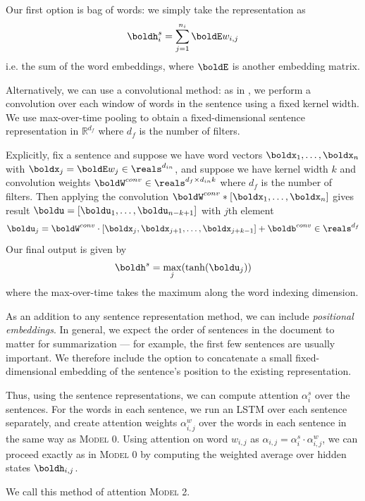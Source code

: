 \documentclass[12pt]{report}
\begin{document}
Our first option is bag of words: we simply take the representation as
\begin{equation}
\boldh_i^s = \sum_{j=1}^{n_i} \boldE w_{i,j}
\end{equation}
i.e. the sum of the word embeddings, where $\boldE$ is another embedding matrix.

Alternatively, we can use a convolutional method: as in \citet{kim2014convolutional}, we perform a convolution over each window of words in the sentence using a fixed kernel width. We use max-over-time pooling to obtain a fixed-dimensional sentence representation in $\mathbb{R}^{d_f}$ where $d_f$ is the number of filters.

Explicitly, fix a sentence and suppose we have word vectors $\boldx_1, \ldots, \boldx_n$ with $\boldx_j = \boldE w_j \in \reals^{d_{in}}$, and suppose we have kernel width $k$ and convolution weights $\boldW^{conv} \in \reals^{d_f \times d_{in} k}$ where $d_f$ is the number of filters. Then applying the convolution
$\boldW^{conv} * [\boldx_1, \ldots, \boldx_n]$ gives result $\boldu = [\boldu_1, \ldots, \boldu_{n-k+1}]$ with $j$th element
$$\boldu_j = \boldW^{conv} \cdot [\boldx_j, \boldx_{j+1}, \ldots, \boldx_{j+k-1}] + \boldb^{conv} \in \reals^{d_f}$$
Our final output is given by 
\begin{equation}
\boldh^s = \max_j(\tanh(\boldu_j))
\end{equation}
where the max-over-time takes the maximum along the word indexing dimension.

As an addition to any sentence representation method, we can include \emph{positional embeddings}. In general, we expect the order of sentences in the document to matter for summarization --- for example, the first few sentences are usually important.
We therefore include the option to concatenate a small fixed-dimensional embedding of the sentence's position to the existing representation.

Thus, using the sentence representations, we can compute attention $\alpha_i^s$ over the sentences.
For the words in each sentence, we run an LSTM over each sentence separately, and create attention weights $\alpha_{i,j}^w$ over the words in each sentence in the same way as \textsc{Model 0}. Using attention on word $w_{i,j}$ as  $\alpha_{i,j} = \alpha_i^s \cdot \alpha_{i,j}^w$, we can proceed exactly as in \textsc{Model 0} by computing the weighted average over hidden states $\boldh_{i,j}$.

We call this method of attention \textsc{Model 2}.
\end{document}
